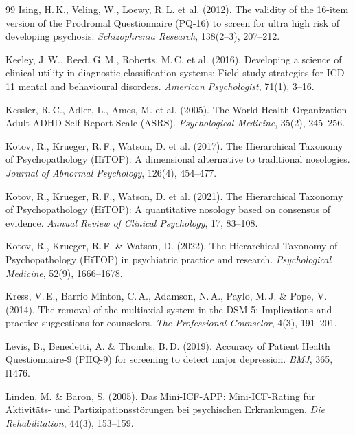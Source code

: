 \documentclass[11pt,a4paper]{article}
\begin{document}
\begin{thebibliography}{99}
Ising, H.\,K., Veling, W., Loewy, R.\,L. et al. (2012).
\newblock The validity of the 16-item version of the Prodromal Questionnaire (PQ-16) to screen for ultra high risk of developing psychosis.
\newblock \textit{Schizophrenia Research}, 138(2--3), 207--212.

Keeley, J.\,W., Reed, G.\,M., Roberts, M.\,C. et al. (2016).
\newblock Developing a science of clinical utility in diagnostic classification systems: Field study strategies for ICD-11 mental and behavioural disorders.
\newblock \textit{American Psychologist}, 71(1), 3--16.

Kessler, R.\,C., Adler, L., Ames, M. et al. (2005).
\newblock The World Health Organization Adult ADHD Self-Report Scale (ASRS).
\newblock \textit{Psychological Medicine}, 35(2), 245--256.

Kotov, R., Krueger, R.\,F., Watson, D. et al. (2017).
\newblock The Hierarchical Taxonomy of Psychopathology (HiTOP): A dimensional alternative to traditional nosologies.
\newblock \textit{Journal of Abnormal Psychology}, 126(4), 454--477.

Kotov, R., Krueger, R.\,F., Watson, D. et al. (2021).
\newblock The Hierarchical Taxonomy of Psychopathology (HiTOP): A quantitative nosology based on consensus of evidence.
\newblock \textit{Annual Review of Clinical Psychology}, 17, 83--108.

Kotov, R., Krueger, R.\,F. \& Watson, D. (2022).
\newblock The Hierarchical Taxonomy of Psychopathology (HiTOP) in psychiatric practice and research.
\newblock \textit{Psychological Medicine}, 52(9), 1666--1678.

Kress, V.\,E., Barrio Minton, C.\,A., Adamson, N.\,A., Paylo, M.\,J. \& Pope, V. (2014).
\newblock The removal of the multiaxial system in the DSM-5: Implications and practice suggestions for counselors.
\newblock \textit{The Professional Counselor}, 4(3), 191--201.

Levis, B., Benedetti, A. \& Thombs, B.\,D. (2019).
\newblock Accuracy of Patient Health Questionnaire-9 (PHQ-9) for screening to detect major depression.
\newblock \textit{BMJ}, 365, l1476.

Linden, M. \& Baron, S. (2005).
\newblock Das Mini-ICF-APP: Mini-ICF-Rating f\"ur Aktivit\"ats- und Partizipationsst\"orungen bei psychischen Erkrankungen.
\newblock \textit{Die Rehabilitation}, 44(3), 153--159.


\end{thebibliography}
\end{document}
